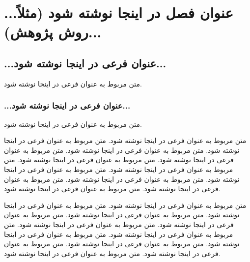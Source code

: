 \chapter{...عنوان فصل در اینجا نوشته شود (مثلاً روش پژوهش)...}

\section{...عنوان فرعی در اینجا نوشته شود...}

متن مربوط به عنوان فرعی در اینجا نوشته شود.

\subsection{...عنوان فرعی در اینجا نوشته شود...}

متن مربوط به عنوان فرعی در اینجا نوشته شود.

\newpage
متن مربوط به عنوان فرعی در اینجا نوشته شود.
متن مربوط به عنوان فرعی در اینجا نوشته شود.
متن مربوط به عنوان فرعی در اینجا نوشته شود.
متن مربوط به عنوان فرعی در اینجا نوشته شود.
متن مربوط به عنوان فرعی در اینجا نوشته شود.
متن مربوط به عنوان فرعی در اینجا نوشته شود.
متن مربوط به عنوان فرعی در اینجا نوشته شود.
متن مربوط به عنوان فرعی در اینجا نوشته شود.
متن مربوط به عنوان فرعی در اینجا نوشته شود.
متن مربوط به عنوان فرعی در اینجا نوشته شود.

\newpage
متن مربوط به عنوان فرعی در اینجا نوشته شود.
متن مربوط به عنوان فرعی در اینجا نوشته شود.
متن مربوط به عنوان فرعی در اینجا نوشته شود.
متن مربوط به عنوان فرعی در اینجا نوشته شود.
متن مربوط به عنوان فرعی در اینجا نوشته شود.
متن مربوط به عنوان فرعی در اینجا نوشته شود.
متن مربوط به عنوان فرعی در اینجا نوشته شود.
متن مربوط به عنوان فرعی در اینجا نوشته شود.
متن مربوط به عنوان فرعی در اینجا نوشته شود.
متن مربوط به عنوان فرعی در اینجا نوشته شود.

